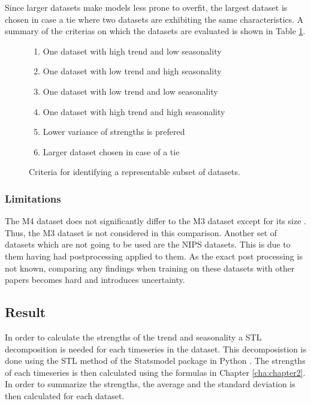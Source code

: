 Since larger datasets make models less prone to overfit, the largest dataset is chosen in case a tie where two datasets are exhibiting the same characteristics. A summary of the criterias on which the datasets are evaluated is shown in Table \ref{dataset_criteria}.

\begin{figure}[h]
    \begin{enumerate}
        \item One dataset with high trend and low seasonality
        \item One dataset with low trend and high seasonality
        \item One dataset with low trend and low seasonality
        \item One dataset with high trend and high seasonality
        \item Lower variance of strengths is prefered
        \item Larger dataset chosen in case of a tie
    \end{enumerate}
    \caption{Criteria for identifying a representable subset of datasets.}
    \label{dataset_criteria}
\end{figure}


\subsubsection{Limitations}
The M4 dataset does not significantly differ to the M3 dataset except for its size \cite{m3_vs_M4}. Thus, the M3 dataset is not considered in this comparison. Another set of datasets which are not going to be used are the NIPS datasets. This is due to them having had postprocessing applied to them. As the exact post processing is not known, comparing any findings when training on these datasets with other papers becomes hard and introduces uncertainty.

\subsection{Result}
In order to calculate the strengths of the trend and seasonality a STL decomposition is needed for each timeseries in the dataset. This decomposistion is done using the STL method of the Statsmodel package in Python \cite{seabold2010statsmodels}. The strengths of each timeseries is then calculated using the formulas in Chapter \ref{cha:chapter2}. In order to summarize the strengths, the average and the standard deviation is then calculated for each dataset.

